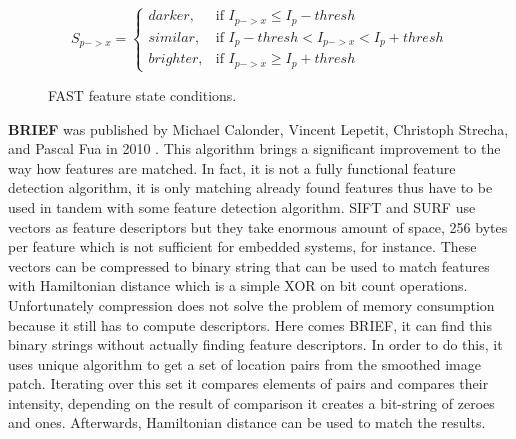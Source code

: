 \documentclass[../../../../main]{subfiles}
\begin{document}
\begin{figure} [!ht]
  \centering    
    \begin{equation}
        S_{p->x} = 
        \begin{cases} 
            darker, & \mbox{if } I_{p->x} \leq I_p-thresh \\
            similar, & \mbox{if } I_p-thresh < I_{p->x} < I_p+thresh\\
            brighter, & \mbox{if } I_{p->x} \geq I_p+thresh 
        \end{cases}
        \label{fig:fast_states}
    \end{equation}
    \label{fig:fast_state}
  \caption{FAST feature state conditions.}
\end{figure}

\textbf{\ac{BRIEF}} was published by Michael Calonder, Vincent Lepetit, Christoph Strecha, and Pascal Fua in 2010 \cite{brief_2010}. This algorithm brings a significant improvement to the way how features are matched. In fact, it is not a fully functional feature detection algorithm, it is only matching already found features thus have to be used in tandem with some feature detection algorithm. \ac{SIFT} and \ac{SURF} use vectors as feature descriptors but they take enormous amount of space, 256 bytes per feature which is not sufficient for embedded systems, for instance. These vectors can be compressed to binary string that can be used to match features with Hamiltonian distance which is a simple XOR on bit count operations. Unfortunately compression does not solve the problem of memory consumption because it still has to compute descriptors. Here comes \ac{BRIEF}, it can find this binary strings without actually finding feature descriptors. In order to do this, it uses unique algorithm to get a set of location pairs from the smoothed image patch. Iterating over this set it compares elements of pairs and compares their intensity, depending on the result of comparison it creates a bit-string of zeroes and ones. Afterwards, Hamiltonian distance can be used to match the results.
\end{document}
